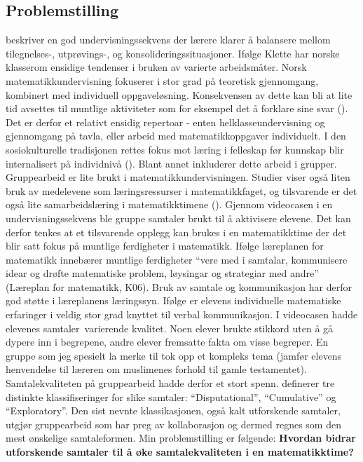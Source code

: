 \documentclass[12pt,twoside,onecolumn,norsk]{article}
\begin{document}
\subsection*{Problemstilling}
 beskriver en god undervisningssekvens der lærere 
klarer å balansere mellom tilegnelses-, utprøvings-, og 
konsolideringssituasjoner. Ifølge Klette har norske klasserom ensidige 
tendenser i bruken av varierte arbeidsmåter. Norsk 
matematikkundervisning fokuserer i stor grad på teoretisk gjennomgang, 
kombinert med individuell oppgaveløsning. Konsekvensen av dette kan 
bli at lite tid avsettes til muntlige aktiviteter som for eksempel det 
å forklare sine svar (). Det er derfor 
et relativt ensidig repertoar - enten helklasseundervisning og 
gjennomgang på tavla, eller arbeid med matematikkoppgaver individuelt. 
I den sosiokulturelle tradisjonen rettes fokus mot læring i felleskap 
før kunnskap blir internalisert på individnivå (). 
Blant annet inkluderer dette arbeid i grupper. Gruppearbeid er lite 
brukt i matematikkundervisningen. Studier viser også liten bruk av 
medelevene som læringsressurser i matematikkfaget, og tilsvarende er 
det også lite samarbeidslæring i matematikktimene (). 
Gjennom videocasen i en undervisningssekvens ble gruppe samtaler 
brukt til å aktivisere elevene. Det kan derfor tenkes at et 
tilsvarende opplegg kan brukes i en matematikktime der det blir satt 
fokus på muntlige ferdigheter i matematikk.
\newline
\newline
Ifølge læreplanen for matematikk innebærer muntlige ferdigheter ``vere med i
samtalar, kommunisere idear og drøfte matematiske problem, løysingar og 
strategiar med andre'' (Læreplan for matematikk, K06). Bruk av samtale og 
kommunikasjon har derfor god støtte i læreplanens læringssyn. Ifølge 
 er elevens individuelle matematiske erfaringer i 
veldig stor grad knyttet til verbal kommunikasjon. I videocasen hadde elevenes 
samtaler varierende kvalitet. Noen elever brukte stikkord uten å gå dypere inn 
i begrepene, andre elever fremsatte fakta om visse begreper. En gruppe som 
jeg spesielt la merke til tok opp et kompleks tema (jamfør elevens henvendelse 
til læreren om muslimenes forhold til gamle testamentet). Samtalekvaliteten på 
gruppearbeid hadde derfor et stort spenn.  
definerer tre distinkte klassifiseringer for slike samtaler: ``Disputational'', 
``Cumulative'' og ``Exploratory''. Den sist nevnte klassikasjonen, også kalt 
utforskende samtaler, utgjør gruppearbeid som har preg av kollaborasjon og 
dermed regnes som den mest ønskelige samtaleformen.
\newline
\newline
Min problemstilling er følgende:
\newline
\newline
\textbf{Hvordan bidrar utforskende samtaler til å øke samtalekvaliteten i en 
matematikktime?}
\end{document}
